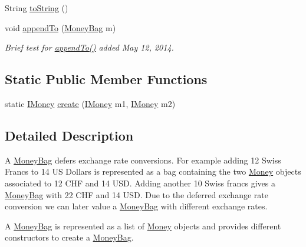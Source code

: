 \begin{DoxyCompactItemize}
\item 
String \mbox{\hyperlink{classes_1_1deusto_1_1testing_1_1junit_1_1_money_bag_a85b49bdc3ff191abdaa1ad1a065ec5f1}{to\+String}} ()
\item 
void \mbox{\hyperlink{classes_1_1deusto_1_1testing_1_1junit_1_1_money_bag_ac8a5877b35b12939ce14543872ed18af}{append\+To}} (\mbox{\hyperlink{classes_1_1deusto_1_1testing_1_1junit_1_1_money_bag}{Money\+Bag}} m)
\begin{DoxyCompactList}\small\item\em Brief test for \mbox{\hyperlink{classes_1_1deusto_1_1testing_1_1junit_1_1_money_bag_ac8a5877b35b12939ce14543872ed18af}{append\+To()}} added May 12, 2014. \end{DoxyCompactList}\end{DoxyCompactItemize}
\subsection*{Static Public Member Functions}
\begin{DoxyCompactItemize}
\item 
static \mbox{\hyperlink{interfacees_1_1deusto_1_1testing_1_1junit_1_1_i_money}{I\+Money}} \mbox{\hyperlink{classes_1_1deusto_1_1testing_1_1junit_1_1_money_bag_a8d2d54a342d2de2b75530600123efc9a}{create}} (\mbox{\hyperlink{interfacees_1_1deusto_1_1testing_1_1junit_1_1_i_money}{I\+Money}} m1, \mbox{\hyperlink{interfacees_1_1deusto_1_1testing_1_1junit_1_1_i_money}{I\+Money}} m2)
\end{DoxyCompactItemize}


\subsection{Detailed Description}
A \mbox{\hyperlink{classes_1_1deusto_1_1testing_1_1junit_1_1_money_bag}{Money\+Bag}} defers exchange rate conversions. For example adding 12 Swiss Francs to 14 US Dollars is represented as a bag containing the two \mbox{\hyperlink{classes_1_1deusto_1_1testing_1_1junit_1_1_money}{Money}} objects associated to 12 C\+HF and 14 U\+SD. Adding another 10 Swiss francs gives a \mbox{\hyperlink{classes_1_1deusto_1_1testing_1_1junit_1_1_money_bag}{Money\+Bag}} with 22 C\+HF and 14 U\+SD. Due to the deferred exchange rate conversion we can later value a \mbox{\hyperlink{classes_1_1deusto_1_1testing_1_1junit_1_1_money_bag}{Money\+Bag}} with different exchange rates.

A \mbox{\hyperlink{classes_1_1deusto_1_1testing_1_1junit_1_1_money_bag}{Money\+Bag}} is represented as a list of \mbox{\hyperlink{classes_1_1deusto_1_1testing_1_1junit_1_1_money}{Money}} objects and provides different constructors to create a \mbox{\hyperlink{classes_1_1deusto_1_1testing_1_1junit_1_1_money_bag}{Money\+Bag}}. 

